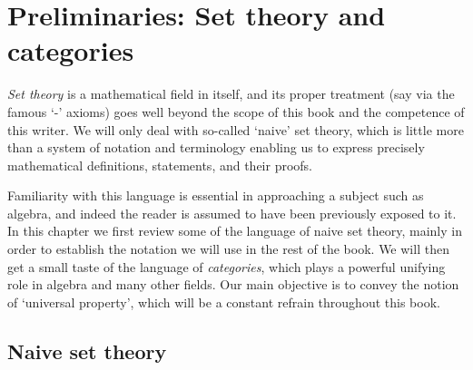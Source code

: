 \chapter{Preliminaries: Set theory and categories}%
\label{chap:prelims}

\emph{Set theory} is a mathematical field in itself, and its proper
treatment (say via the famous `-'
axioms) goes well beyond the scope of this book and the competence of
this writer. We will only deal with so-called `naive' set theory,
which is little more than a system of notation and terminology
enabling us to express precisely mathematical definitions, statements,
and their proofs.

Familiarity with this language is essential in approaching a subject
such as algebra, and indeed the reader is assumed to have been
previously exposed to it.  In this chapter we first review some of the
language of naive set theory, mainly in order to establish the
notation we will use in the rest of the book. We will then get a small
taste of the language of \emph{categories}, which plays a powerful
unifying role in algebra and many other fields. Our main objective is
to convey the notion of `universal property', which will be a constant
refrain throughout this book.

\section{Naive set theory}%
\label{sec:prelims:naive-set-theory}

